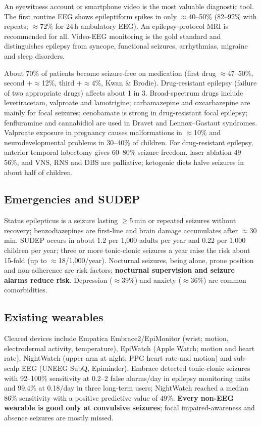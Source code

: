 An eyewitness account or smartphone video is the most valuable diagnostic tool. The first routine EEG shows epileptiform spikes in only $\approx$40--50\% (82--92\% with repeats; $\approx$72\% for 24\,h ambulatory EEG). An epilepsy-protocol MRI is recommended for all. Video-EEG monitoring is the gold standard and distinguishes epilepsy from syncope, functional seizures, arrhythmias, migraine and sleep disorders.

About 70\% of patients become seizure-free on medication (first drug $\approx$47--50\%, second $+\approx$12\%, third $+\approx$4\%, Kwan \& Brodie). Drug-resistant epilepsy (failure of two appropriate drugs) affects about 1 in 3. Broad-spectrum drugs include levetiracetam, valproate and lamotrigine; carbamazepine and oxcarbazepine are mainly for focal seizures; cenobamate is strong in drug-resistant focal epilepsy; fenfluramine and cannabidiol are used in Dravet and Lennox--Gastaut syndromes. Valproate exposure in pregnancy causes malformations in $\approx$10\% and neurodevelopmental problems in 30--40\% of children. For drug-resistant epilepsy, anterior temporal lobectomy gives 60--80\% seizure freedom, laser ablation 49--56\%, and VNS, RNS and DBS are palliative; ketogenic diets halve seizures in about half of children.

\subsection{Emergencies and SUDEP}

Status epilepticus is a seizure lasting $\ge$5\,min or repeated seizures without recovery; benzodiazepines are first-line and brain damage accumulates after $\approx$30\,min. SUDEP occurs in about 1.2 per 1,000 adults per year and 0.22 per 1,000 children per year; three or more tonic-clonic seizures a year raise the risk about 15-fold (up to $\approx$18/1,000/year). Nocturnal seizures, being alone, prone position and non-adherence are risk factors; \textbf{nocturnal supervision and seizure alarms reduce risk}. Depression ($\approx$39\%) and anxiety ($\approx$36\%) are common comorbidities.

\subsection{Existing wearables}

Cleared devices include Empatica Embrace2/EpiMonitor (wrist; motion, electrodermal activity, temperature), EpiWatch (Apple Watch; motion and heart rate), NightWatch (upper arm at night; PPG heart rate and motion) and sub-scalp EEG (UNEEG SubQ, Epiminder). Embrace detected tonic-clonic seizures with 92--100\% sensitivity at 0.2--2 false alarms/day in epilepsy monitoring units and 99.4\% at 0.18/day in three long-term users; NightWatch reached a median 86\% sensitivity with a positive predictive value of 49\%. \textbf{Every non-EEG wearable is good only at convulsive seizures}; focal impaired-awareness and absence seizures are mostly missed.

